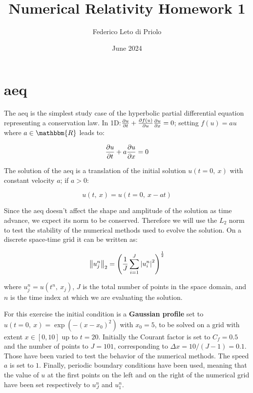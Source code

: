 \documentclass[11pt, a4paper]{article}
\title{Numerical Relativity Homework 1}
\author{Federico Leto di Priolo}
\date{June 2024}
\begin{document}
\maketitle

\section{\acrfull{aeq}}

The \acrshort{aeq} is the simplest study case of the hyperbolic partial differential equation representing a conservation law. In 1D:\(\pdv{u}{t} + \pdv{f(u)}{u} \pdv{u}{x} = 0\); setting \(f(u) = au\) where \(a \in \mathbbm{R}\) leads to:

\begin{equation} \label{eq:adv_eq}
    \pdv{u}{t} + a \pdv{u}{x} = 0
\end{equation}

\noindent
The solution of the \acrshort{aeq} is a translation of the initial solution \(u(t = 0,\ x)\) with constant velocity \(a\); if \(a > 0\):

\begin{equation} \label{eq:adv_sol}
    u(t,\ x) = u(t = 0,\ x - at)
\end{equation}

Since the \acrshort{aeq} doesn't affect the shape and amplitude of the solution as time advance, we expect its norm to be conserved. Therefore we will use the \(L_2\) norm to test the stability of the numerical methods used to evolve the solution. On a discrete space-time grid it can be written as:

\begin{equation} \label{eq:l2_norm}
    \norm{u^n_j}_2 = \qty(\frac{1}{J} \sum_{i = 1}^J \abs{u^n_i}^2)^\frac{1}{2}
\end{equation}

\noindent
where \(u^n_j = u(t^n,\ x_j)\), \(J\) is the total number of points in the space domain, and \(n\) is the time index at which we are evaluating the solution.

For this exercise the initial condition is a \textbf{Gaussian profile} set to \(u(t = 0,\ x) = \exp(-(x - x_0)^2)\) with \(x_0 = 5\), to be solved on a grid with extent \(x \in [0, 10]\) up to \(t = 20\). Initially the Courant factor is set to \(C_f = 0.5\) and the number of points to \(J = 101\), corresponding to \(\Delta x = 10 / (J - 1) = 0.1\). Those have been varied to test the behavior of the numerical methods. The speed \(a\) is set to \(1\). Finally, periodic boundary conditions have been used, meaning that the value of \(u\) at the first points on the left and on the right of the numerical grid have been set respectively to \(u^n_J\) and \(u^n_1\).
\end{document}
